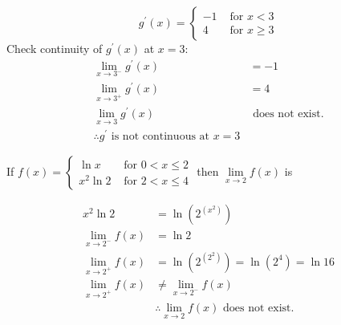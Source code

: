 \documentclass[12pt,letterpaper, onecolumn]{exam}
\begin{document}
\begin{questions}
\begin{solution}
	$$ g^\prime(x) =
	\begin{cases}
	-1 & \text{ for } x < 3 \\
	 4 & \text{ for } x \geq 3
	\end{cases}	
	$$
	Check continuity of $g^\prime(x)$ at $x=3$:
	\begin{align*}
		\lim_{x\to3^-} g^\prime(x)  &=  -1 \\ %
		\lim_{x\to3^+} g^\prime(x) &= 4 \\ %
		\lim_{x\to3} g^\prime(x)      & \text{ does not exist.} \\ %
		\boxed{\therefore g^\prime \text{ is not continuous at } x=3}
	\end{align*}

    \end{solution}
    

\pagebreak

\question 
    If $ f(x) = 
\begin{cases}
	\ln x 		& \text{ for } 	    0 < x \leq 2 \\ 
	x^2 \ln 2 	& \text { for } 	2 < x \leq 4
\end{cases}
$ then $ \lim\limits_{x\to2} f(x) $ is


    
    \begin{solution}
	
            \begin{align*}
		x^2 \ln 2		 &= \ln ( 2 ^  {(x ^ 2)} ) \\
		\lim_{x\to2^-} f(x)  &=  \ln 2 \\ %
		\lim_{x\to2^+} f(x) &= \ln (2^{(2^2)}) = \ln (2^4) = \ln 16 \\ %
		\lim_{x\to2^+} f(x) & \neq \lim_{x\to2^-} f(x) \\ %
					 & \therefore \boxed{\lim_{x\to2} f(x) \text{ does not exist.}}
	\end{align*}
    \end{solution}
 

\end{questions}
\end{document}
